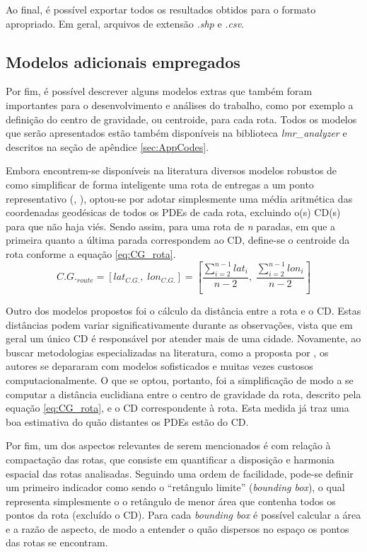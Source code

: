 Ao final, é possível exportar todos os resultados obtidos para o formato apropriado. Em geral, arquivos de extensão \textit{.shp} e \textit{.csv}.

\subsection{Modelos adicionais empregados}

Por fim, é possível descrever alguns modelos extras que também foram importantes para o desenvolvimento e análises do trabalho, como por exemplo a definição do centro de gravidade, ou centroide, para cada rota.
Todos os modelos que serão apresentados estão também disponíveis na biblioteca \textit{lmr\_analyzer} e descritos na seção de apêndice \ref{sec:AppCodes}. 

Embora encontrem-se disponíveis na literatura diversos modelos robustos de como simplificar de forma inteligente uma rota de entregas a um ponto representativo (, \citeyear{daganzo1984distance}), optou-se por adotar simplesmente uma média aritmética das coordenadas geodésicas de todos os PDEs de cada rota, excluindo o(s) CD(s) para que não haja viés.
%
Sendo assim, para uma rota de \textit{n} paradas, em que a primeira quanto a última parada correspondem ao CD, define-se o centroide da rota conforme a equação \ref{eq:CG_rota}.
%
\begin{equation}\label{eq:CG_rota}
    C.G._{route} = \left[lat_{C.G.},\; lon_{C.G.}\right] = \left[\frac{\sum_{i=2}^{n-1} lat_{i}}{n-2},\; \frac{\sum_{i=2}^{n-1} lon_{i}}{n-2}\right]
\end{equation}

Outro dos modelos propostos foi o cálculo da distância entre a rota e o CD.
Estas distâncias podem variar significativamente durante as observações, vista que em geral um único CD é responsável por atender mais de uma cidade. 
%
Novamente, ao buscar metodologias especializadas na literatura, como a proposta por , os autores se depararam com modelos sofisticados e muitas vezes custosos computacionalmente.
%
O que se optou, portanto, foi a simplificação de modo a se computar a distância euclidiana entre o centro de gravidade da rota, descrito pela equação \ref{eq:CG_rota}, e o CD correspondente à rota.
Esta medida já traz uma boa estimativa do quão distantes os PDEs estão do CD. 

Por fim, um dos aspectos relevantes de serem mencionados é com relação à compactação das rotas, que consiste em quantificar a disposição e harmonia espacial das rotas analisadas.
%
Seguindo uma ordem de facilidade, pode-se definir um primeiro indicador como sendo o ``retângulo limite'' (\textit{bounding box}), o qual representa simplesmente o o retângulo de menor área que contenha todos os pontos da rota (excluído o CD).
Para cada \textit{bounding box} é possível calcular a área e a razão de aspecto, de modo a entender o quão dispersos no espaço os pontos das rotas se encontram. 

